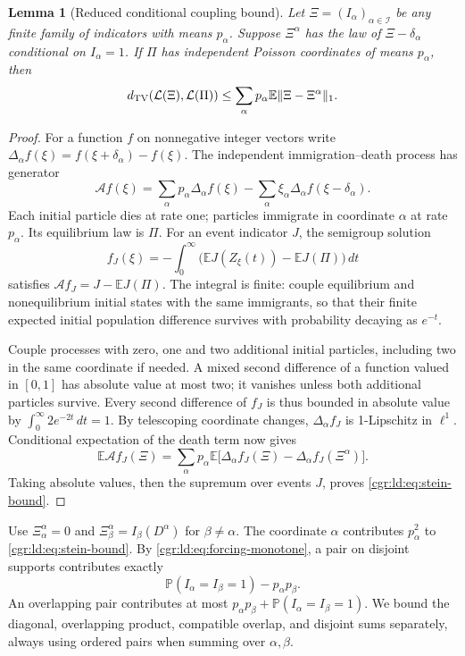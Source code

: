 \documentclass[11pt,letterpaper]{article}
\numberwithin{equation}{section}
\newtheorem{lemma}[theorem]{Lemma}
\theoremstyle{definition}\newtheorem{definition}[theorem]{Definition}
\theoremstyle{remark}\newtheorem{remark}[theorem]{Remark}
\newcommand{\PP}{\mathbb P}
\newcommand{\EE}{\mathbb E}
\begin{document}
\begin{lemma}[Reduced conditional coupling bound]\label{cgr:ld:lem:stein}
Let $\Xi=(I_\alpha)_{\alpha\in\mathcal I}$ be any finite family
of indicators with means $p_\alpha$. Suppose $\Xi^\alpha$ has
the law of $\Xi-\delta_\alpha$ conditional on $I_\alpha=1$.
If $\Pi$ has independent Poisson coordinates of means
$p_\alpha$, then
\begin{equation}\label{cgr:ld:eq:stein-bound}
 d_{\rm TV}(\mathcal L(\Xi),\mathcal L(\Pi))
 \le\sum_\alpha p_\alpha\EE\|\Xi-\Xi^\alpha\|_1.
\end{equation}
\end{lemma}
\begin{proof}
For a function $f$ on nonnegative integer vectors write
$\Delta_\alpha f(\xi)=f(\xi+\delta_\alpha)-f(\xi)$.
The independent immigration--death process has generator
\[
 \mathcal Af(\xi)=\sum_\alpha p_\alpha\Delta_\alpha f(\xi)
 -\sum_\alpha\xi_\alpha\Delta_\alpha f(\xi-\delta_\alpha).
\]
Each initial particle dies at rate one; particles immigrate in
coordinate $\alpha$ at rate $p_\alpha$. Its equilibrium law is
$\Pi$. For an event indicator $J$, the semigroup solution
\[
 f_J(\xi)=-\int_0^\infty
 \bigl(\EE J(Z_\xi(t))-\EE J(\Pi)\bigr)\,dt
\]
satisfies $\mathcal Af_J=J-\EE J(\Pi)$. The integral is finite:
couple equilibrium and nonequilibrium initial states with the
same immigrants, so that their finite expected initial
population difference survives with probability decaying as
$e^{-t}$.

Couple processes with zero, one and two additional initial
particles, including two in the same coordinate if needed. A
mixed second difference of a function valued in $[0,1]$ has
absolute value at most two; it vanishes unless both additional
particles survive. Every second difference of $f_J$ is thus
bounded in absolute value by
$\int_0^\infty2e^{-2t}\,dt=1$. By telescoping coordinate
changes, $\Delta_\alpha f_J$ is 1-Lipschitz in $\ell^1$.
Conditional expectation of the death term now gives
\[
 \EE\mathcal Af_J(\Xi)=\sum_\alpha p_\alpha\EE
 \bigl[\Delta_\alpha f_J(\Xi)-
       \Delta_\alpha f_J(\Xi^\alpha)\bigr].
\]
Taking absolute values, then the supremum over events $J$,
proves \eqref{cgr:ld:eq:stein-bound}.
\end{proof}

Use $\Xi^\alpha_\alpha=0$ and
$\Xi^\alpha_\beta=I_\beta(D^\alpha)$ for $\beta\ne\alpha$.
The coordinate $\alpha$ contributes $p_\alpha^2$ to
\eqref{cgr:ld:eq:stein-bound}. By \eqref{cgr:ld:eq:forcing-monotone}, a
pair on disjoint supports contributes exactly
\[
 \PP(I_\alpha=I_\beta=1)-p_\alpha p_\beta.
\]
An overlapping pair contributes at most
$p_\alpha p_\beta+\PP(I_\alpha=I_\beta=1)$. We bound the
diagonal, overlapping product, compatible overlap, and disjoint
sums separately, always using ordered pairs when summing over
$\alpha,\beta$.
\end{document}
